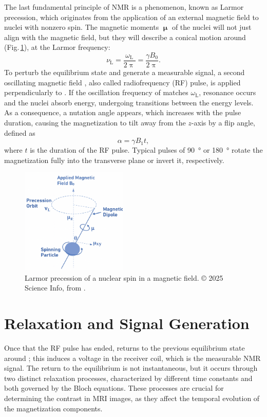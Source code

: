 The last fundamental principle of NMR is a phenomenon, known as Larmor precession, which originates from the application of an external magnetic field to nuclei with nonzero spin. The magnetic moments $\bm{\upmu}$ of the nuclei will not just align with the magnetic field, but they will describe a conical motion around  (Fig.\,\ref{fig:larmor_precession}), at the Larmor frequency:
\begin{equation}
    \nu_\textrm{L} = \frac{\omega_\textrm{L}}{2\uppi} = \frac{\gamma B_0}{2\uppi}.
\end{equation}
To perturb the equilibrium state and generate a measurable signal, a second oscillating magnetic field , also called radiofrequency (RF) pulse, is applied perpendicularly to . If the oscillation frequency of  matches $\omega_\mathrm{L}$, resonance occurs and the nuclei absorb energy, undergoing transitions between the energy levels. As a consequence, a nutation angle appears, which increases with the pulse duration, causing the magnetization  to tilt away from the $z$-axis by a flip angle, defined as
\begin{equation}
    \alpha = \gamma B_1 t,
\end{equation}
where $t$ is the duration of the RF pulse. Typical pulses of \qty{90}{\degree} or \qty{180}{\degree} rotate the magnetization fully into the transverse plane or invert it, respectively.

\begin{figure}[htbp]
    \centering
    \includegraphics[width=0.45\textwidth]{figures/larmor_precession.png}
    \caption{Larmor precession of a nuclear spin in a magnetic field. © 2025 Science Info, from \cite{science_info}.}
    \label{fig:larmor_precession}
\end{figure}

\section{Relaxation and Signal Generation}
Once that the RF pulse has ended,  returns to the previous equilibrium state around ; this induces a voltage in the receiver coil, which is the measurable NMR signal. The return to the equilibrium is not instantaneous, but it occurs through two distinct relaxation processes, characterized by different time constants and both governed by the Bloch equations. These processes are crucial for determining the contrast in MRI images, as they affect the temporal evolution of the magnetization components.


